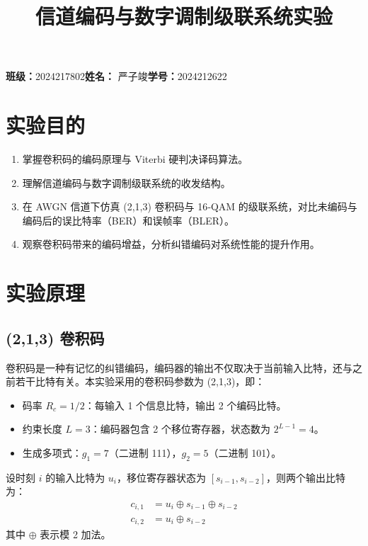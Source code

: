 \documentclass[UTF8]{ctexart}
\title{\textbf{信道编码与数字调制级联系统实验}}
\author{}
\begin{document}
\maketitle

\begin{center}
    \textbf{班级：}2024217802\quad \textbf{姓名：} 严子竣\quad \textbf{学号：}2024212622
\end{center}

\section{实验目的}
\begin{enumerate}
    \item 掌握卷积码的编码原理与 Viterbi 硬判决译码算法。
    \item 理解信道编码与数字调制级联系统的收发结构。
    \item 在 AWGN 信道下仿真 (2,1,3) 卷积码与 16‑QAM 的级联系统，对比未编码与编码后的误比特率（BER）和误帧率（BLER）。
    \item 观察卷积码带来的编码增益，分析纠错编码对系统性能的提升作用。
\end{enumerate}

\section{实验原理}

\subsection{(2,1,3) 卷积码}
卷积码是一种有记忆的纠错编码，编码器的输出不仅取决于当前输入比特，还与之前若干比特有关。本实验采用的卷积码参数为 (2,1,3)，即：
\begin{itemize}
    \item 码率 \(R_c = 1/2\)：每输入 1 个信息比特，输出 2 个编码比特。
    \item 约束长度 \(L = 3\)：编码器包含 2 个移位寄存器，状态数为 \(2^{L-1}=4\)。
    \item 生成多项式：\(g_1 = 7\)（二进制 111），\(g_2 = 5\)（二进制 101）。
\end{itemize}

设时刻 \(i\) 的输入比特为 \(u_i\)，移位寄存器状态为 \([s_{i-1}, s_{i-2}]\)，则两个输出比特为：
\begin{align}
    c_{i,1} &= u_i \oplus s_{i-1} \oplus s_{i-2} \\
    c_{i,2} &= u_i \oplus s_{i-2}
\end{align}
其中 \(\oplus\) 表示模 2 加法。
\end{document}
